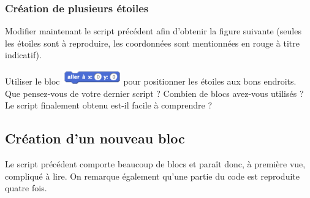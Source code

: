 \subsubsection{Création de plusieurs étoiles}

Modifier maintenant le script précédent afin d’obtenir la figure suivante (seules les étoiles sont à reproduire, les coordonnées sont mentionnées en rouge à titre indicatif).


Utiliser le bloc \includegraphics[width=2.5cm]{./images/scratch03/fonction/Scratch_Fonctions_04} pour positionner les étoiles aux bons endroits.
Que pensez-vous de votre dernier script ? Combien de blocs avez-vous utilisés ? Le script finalement obtenu est-il facile à comprendre ?

\subsection{Création d'un nouveau bloc}

Le script précédent comporte beaucoup de blocs et paraît donc, à première vue, compliqué à lire. On remarque également qu’une partie du code est reproduite quatre fois.



\vspace{1cm}

